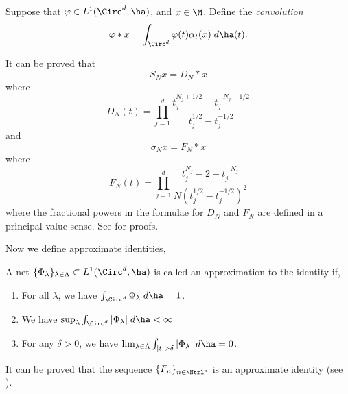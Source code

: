 \begin{definition}
    Suppose that $\varphi \in L^1(\Circ^d,\ha)$, and $x \in \M$. Define the \emph{convolution}
    \begin{equation}
        \varphi * x = \int_{\Circ^d} \varphi(t)\alpha_t(x)\;d\ha(t).
    \end{equation}
\end{definition}

It can be proved that
\begin{equation}
    S_N x = D_N * x
\end{equation}
where 
\begin{equation}
    D_N(t) = \prod_{j=1}^d\frac{t_j^{N_j+1/2}-t_j^{-N_j-1/2}}{t_j^{1/2}-t_j^{-1/2}}
\end{equation}
and
\begin{equation}
    \sigma_N x = F_N*x
\end{equation}
where
\begin{equation}
    F_N(t) = \prod_{j=1}^d\frac{t_j^{N_j}-2+t_j^{-N_j}}{N(t_j^{1/2}-t_j^{-1/2})^2}
\end{equation}
where the fractional powers in the formulae for $D_N$ and $F_N$ are defined
in a principal value sense. See \cite{katznelson} for proofs.

Now we define approximate identities,
\begin{definition}
    A net $\{\Phi_\lambda\}_{\lambda \in \Lambda} \subset L^1(\Circ^d,\ha)$ is called
    an approximation to the identity if,
    \begin{enumerate}
        \item{} For all $\lambda$, we have $\int_{\Circ^d} \Phi_\lambda \;d\ha = 1$.
        \item{} We have $\sup_{\lambda} \int_{\Circ^d} |\Phi_\lambda|\;d\ha < \infty$
        \item{} For any $\delta > 0$, we have $\lim_{\lambda \in \Lambda} \int_{|t| > \delta} |\Phi_\lambda|\;d\ha = 0$.
    \end{enumerate}
\end{definition}

It can be proved that the sequence $\{F_n\}_{n\in\Ntrl^d}$ is an approximate
identity (see \cite{me}).

